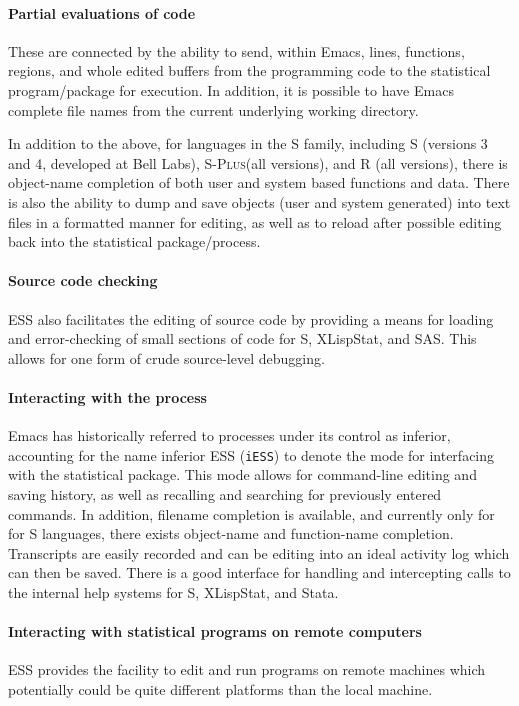 \documentclass{article}
\newcommand*{\Splus}{\textsc{S-Plus}}
\begin{document}
\paragraph{Partial evaluations of code}
These are connected by the ability to send, within Emacs, lines,
functions, regions, and whole edited buffers from the programming code
to the statistical program/package for execution.  In addition, it is
possible to have Emacs complete file names from the current underlying
working directory.

In addition to the above, for languages in the S family, including S
(versions 3 and 4, developed at Bell Labs), \Splus (all versions), and
R (all versions), there is object-name completion of both user and
system based functions and data.  There is also the ability to dump
and save objects (user and system generated) into text files in a
formatted manner for editing, as well as to reload after possible
editing back into the statistical package/process.

\paragraph{Source code checking}
ESS also facilitates the editing of source code by providing a means
for loading and error-checking of small sections of code for S,
XLispStat, and SAS.  This allows for one form of crude source-level
debugging.

\paragraph{Interacting with the process}
Emacs has historically referred to processes under its control as
inferior, accounting for the name inferior ESS (\texttt{iESS}) to
denote the mode for interfacing with the statistical package.  This
mode allows for command-line editing and saving history, as well as
recalling and searching for previously entered commands.  In addition,
filename completion is available, and currently only for for S
languages, there exists object-name and function-name completion.
Transcripts are easily recorded and can be editing into an ideal
activity log which can then be saved.  There is a good interface for
handling and intercepting calls to the internal help systems for S,
XLispStat, and Stata.

\paragraph{Interacting with statistical programs on remote computers}
ESS provides the facility to edit and run programs on remote machines
which potentially could be quite different platforms than the local
machine.
\end{document}
